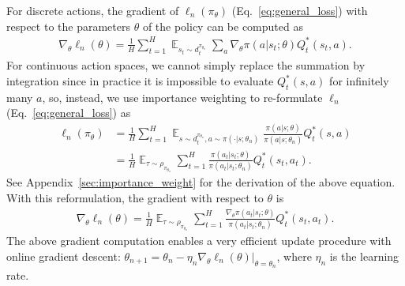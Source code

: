 \documentclass{article}
\newcommand{\BB}[1]{\textcolor{red}{\bf Byron: {#1}}}
\begin{document}
For discrete actions, the gradient of $\ell_n(\pi_{\theta})$ (Eq.~\ref{eq:general_loss}) with respect to the parameters $\theta$ of the policy can be computed as
\begin{align}
\label{eq:regular_dic_gradient}
\nabla_{\theta}\ell_n(\theta) =\frac{1}{H} \sum_{t=1}^H\mathop{\mathbb{E}}_{s_t\sim d_t^{\pi_{\theta_n}}}\sum_{a}\nabla_{\theta}\pi(a|s_t;\theta) Q_t^*(s_t, a).
\end{align}
For continuous action spaces, we cannot simply replace the summation by integration since in practice it is impossible to evaluate $Q_t^*(s,a)$ for infinitely many $a$, %
so, instead, we use importance weighting to re-formulate $\ell_n$ (Eq.~\ref{eq:general_loss}) as
\begin{align}
\label{eq:importance_weight_continuous}
\ell_n(\pi_{\theta})&=\frac{1}{H}\sum_{t=1}^H\mathop{\mathbb{E}}_{s\sim d_t^{\pi_{\theta_n}},a\sim\pi(\cdot|s;\theta_n)}\frac{\pi(a|s;\theta)}{\pi(a|s;\theta_n)}Q^*_t(s,a) \nonumber \\
&= \frac{1}{H}\mathop{\mathbb{E}}_{\tau\sim\rho_{\pi_{\theta_n}}}\sum_{t=1}^H \frac{\pi(a_t|s_t;\theta)}{\pi(a_t|s_t;\theta_n)}Q^*_t(s_t,a_t).
\end{align} See Appendix~\ref{sec:importance_weight} for the derivation of the above equation.
With this reformulation, the gradient with respect to $\theta$ is
\begin{align}
\label{eq:regular_con_gradient}
\nabla_{\theta}\ell_n(\theta) =\frac{1}{H} \mathop{\mathbb{E}}_{\tau\sim\rho_{\pi_{\theta_n}}}\sum_{t=1}^H \frac{\nabla_{\theta}\pi(a_t|s_t;\theta)}{\pi(a_t|s_t;\theta_n)}Q^*_t(s_t,a_t).
\end{align}
The above gradient computation enables a very efficient update procedure with online gradient descent: $\theta_{n+1} = \theta_n - \eta_n \nabla_{\theta}\ell_n(\theta)|_{\theta = \theta_n}$,
where $\eta_n$ is the learning rate.
\end{document}

